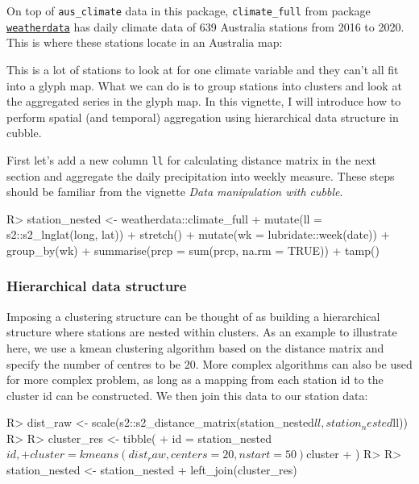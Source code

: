 \documentclass[
]{jss}
\begin{document}
On top of \texttt{aus\_climate} data in this package,
\texttt{climate\_full} from package
\href{https://github.com/huizezhang-sherry/weatherdata}{\texttt{weatherdata}}
has daily climate data of 639 Australia stations from 2016 to 2020. This
is where these stations locate in an Australia map:

This is a lot of stations to look at for one climate variable and they
can't all fit into a glyph map. What we can do is to group stations into
clusters and look at the aggregated series in the glyph map. In this
vignette, I will introduce how to perform spatial (and temporal)
aggregation using hierarchical data structure in cubble.

First let's add a new column \texttt{ll} for calculating distance matrix
in the next section and aggregate the daily precipitation into weekly
measure. These steps should be familiar from the vignette \emph{Data
manipulation with cubble}.

\begin{CodeChunk}
\begin{CodeInput}
R> station_nested <- weatherdata::climate_full %
+   mutate(ll = s2::s2_lnglat(long, lat)) %
+   stretch() %
+   mutate(wk = lubridate::week(date)) %
+   group_by(wk) %
+   summarise(prcp = sum(prcp, na.rm = TRUE)) %
+   tamp()
\end{CodeInput}
\end{CodeChunk}

\hypertarget{hierarchical-data-structure}{%
\subsubsection{Hierarchical data
structure}\label{hierarchical-data-structure}}

Imposing a clustering structure can be thought of as building a
hierarchical structure where stations are nested within clusters. As an
example to illustrate here, we use a kmean clustering algorithm based on
the distance matrix and specify the number of centres to be 20. More
complex algorithms can also be used for more complex problem, as long as
a mapping from each station id to the cluster id can be constructed. We
then join this data to our station data:

\begin{CodeChunk}
\begin{CodeInput}
R> dist_raw <- scale(s2::s2_distance_matrix(station_nested$ll, station_nested$ll))
R> 
R> cluster_res <- tibble(
+   id = station_nested$id,
+   cluster = kmeans(dist_raw, centers = 20, nstart = 50)$cluster
+ )
R> 
R> station_nested <- station_nested %
+   left_join(cluster_res)
\end{CodeInput}
\end{CodeChunk}
\end{document}
